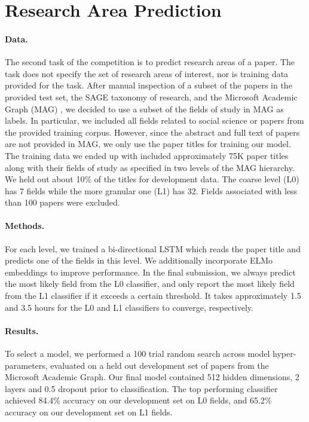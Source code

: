 \section{Research Area Prediction}
\label{sec:areas}

\paragraph{Data.}
The second task of the competition is to predict research areas of a paper. 
The task does not specify the set of research areas of interest, nor is training data provided for the task.
After manual inspection of a subset of the papers in the provided test set, the SAGE taxonomy of research, and the Microsoft Academic Graph (MAG) \cite{Shen2018AWS}, we decided to use a subset of the fields of study in MAG as labels.
In particular, we included all fields related to social science or papers from the provided training corpus.
However, since the abstract and full text of papers are not provided in MAG, we only use the paper titles for training our model.
The training data we ended up with included approximately 75K paper titles along with their fields of study as specified in two levels of the MAG hierarchy. We held out about 10\% of the titles for development data. The coarse level (L0) has 7 fields while the more granular one (L1) has 32. 
Fields associated with less than 100 papers were excluded.

\paragraph{Methods.}
For each level, we trained a bi-directional LSTM which reads the paper title and predicts one of the fields in this level.
We additionally incorporate ELMo embeddings \cite{Peters2018DEEPCW} to improve performance. In the final submission, we always predict the most likely field from the L0 classifier, and only report the most likely field from the L1 classifier if it exceeds a certain threshold. It takes approximately 1.5 and 3.5 hours for the L0 and L1 classifiers to converge, respectively.

\paragraph{Results.}

To select a model, we performed a 100 trial random search across model hyper-parameters, evaluated on a held out development set of papers from the Microsoft Academic Graph. Our final model contained 512 hidden dimensions, 2 layers and 0.5 dropout prior to classification. The top performing classifier achieved 84.4\% accuracy on our development set on L0 fields, and 65.2\% accuracy on our development set on L1 fields. 
 

